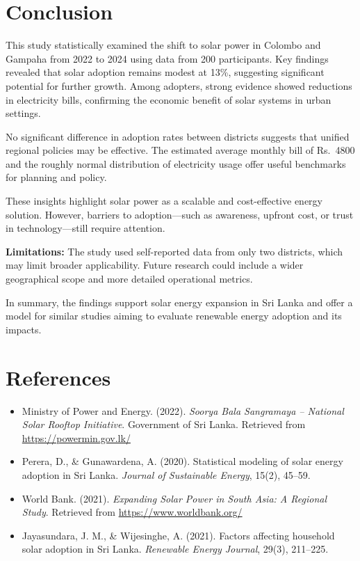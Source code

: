 \documentclass[12pt,a4paper]{article}
\begin{document}
\section{Conclusion}

This study statistically examined the shift to solar power in Colombo and Gampaha from 2022 to 2024 using data from 200 participants. Key findings revealed that solar adoption remains modest at 13\%, suggesting significant potential for further growth. Among adopters, strong evidence showed reductions in electricity bills, confirming the economic benefit of solar systems in urban settings.

No significant difference in adoption rates between districts suggests that unified regional policies may be effective. The estimated average monthly bill of Rs.~4800 and the roughly normal distribution of electricity usage offer useful benchmarks for planning and policy.

These insights highlight solar power as a scalable and cost-effective energy solution. However, barriers to adoption—such as awareness, upfront cost, or trust in technology—still require attention.

\textbf{Limitations:} The study used self-reported data from only two districts, which may limit broader applicability. Future research could include a wider geographical scope and more detailed operational metrics.

In summary, the findings support solar energy expansion in Sri Lanka and offer a model for similar studies aiming to evaluate renewable energy adoption and its impacts.
\section*{References}

\begin{itemize}
    \item Ministry of Power and Energy. (2022). \textit{Soorya Bala Sangramaya – National Solar Rooftop Initiative}. Government of Sri Lanka. Retrieved from \url{https://powermin.gov.lk/}
    
    \item Perera, D., \& Gunawardena, A. (2020). Statistical modeling of solar energy adoption in Sri Lanka. \textit{Journal of Sustainable Energy}, 15(2), 45–59.
    
    \item World Bank. (2021). \textit{Expanding Solar Power in South Asia: A Regional Study}. Retrieved from \url{https://www.worldbank.org/}
    
    \item Jayasundara, J. M., \& Wijesinghe, A. (2021). Factors affecting household solar adoption in Sri Lanka. \textit{Renewable Energy Journal}, 29(3), 211–225.
\end{itemize}
\end{document}
